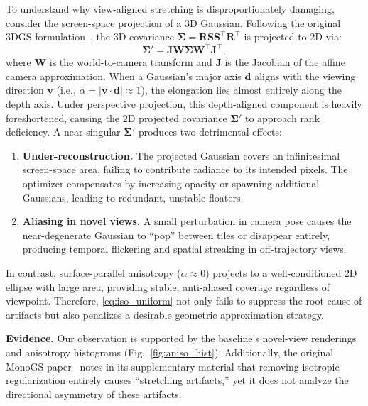 \documentclass[conference]{IEEEtran}
\begin{document}
To understand why view-aligned stretching is disproportionately damaging, consider the screen-space projection of a 3D Gaussian.
Following the original 3DGS formulation~\cite{3dgs}, the 3D covariance $\boldsymbol{\Sigma} = \mathbf{R}\mathbf{S}\mathbf{S}^\top\mathbf{R}^\top$ is projected to 2D via:
\begin{equation}
\boldsymbol{\Sigma}' = \mathbf{J} \mathbf{W} \boldsymbol{\Sigma} \mathbf{W}^\top \mathbf{J}^\top,
\end{equation}
where $\mathbf{W}$ is the world-to-camera transform and $\mathbf{J}$ is the Jacobian of the affine camera approximation.
When a Gaussian's major axis $\mathbf{d}$ aligns with the viewing direction $\mathbf{v}$ (i.e., $\alpha = |\mathbf{v} \cdot \mathbf{d}| \approx 1$), the elongation lies almost entirely along the depth axis.
Under perspective projection, this depth-aligned component is heavily foreshortened, causing the 2D projected covariance $\boldsymbol{\Sigma}'$ to approach rank deficiency.
A near-singular $\boldsymbol{\Sigma}'$ produces two detrimental effects:
\begin{enumerate}
    \item \textbf{Under-reconstruction.} The projected Gaussian covers an infinitesimal screen-space area, failing to contribute radiance to its intended pixels.
    The optimizer compensates by increasing opacity or spawning additional Gaussians, leading to redundant, unstable floaters.
    \item \textbf{Aliasing in novel views.} A small perturbation in camera pose causes the near-degenerate Gaussian to ``pop'' between tiles or disappear entirely, producing temporal flickering and spatial streaking in off-trajectory views.
\end{enumerate}
In contrast, surface-parallel anisotropy ($\alpha \approx 0$) projects to a well-conditioned 2D ellipse with large area, providing stable, anti-aliased coverage regardless of viewpoint.
Therefore, \eqref{eq:iso_uniform} not only fails to suppress the root cause of artifacts but also penalizes a desirable geometric approximation strategy.

\textbf{Evidence.}
Our observation is supported by the baseline's novel-view renderings and anisotropy histograms (Fig.~\ref{fig:aniso_hist}).
Additionally, the original MonoGS paper~\cite{monogs} notes in its supplementary material that removing isotropic regularization entirely causes ``stretching artifacts,'' yet it does not analyze the directional asymmetry of these artifacts.
\end{document}
